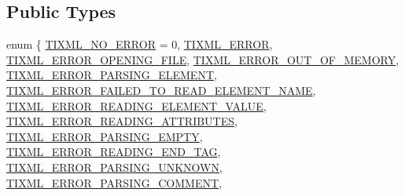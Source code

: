\subsection*{Public Types}
\begin{DoxyCompactItemize}
\item 
enum \{ \newline
\hyperlink{class_ti_xml_base_a4b788e6990f18d930cc68e38587f05cda750a76ca602241c416d5ec357d55fba1}{T\+I\+X\+M\+L\+\_\+\+N\+O\+\_\+\+E\+R\+R\+OR} = 0, 
\hyperlink{class_ti_xml_base_a4b788e6990f18d930cc68e38587f05cdabcabc1b8efabeda1cc4352aa73d64390}{T\+I\+X\+M\+L\+\_\+\+E\+R\+R\+OR}, 
\hyperlink{class_ti_xml_base_a4b788e6990f18d930cc68e38587f05cdab803949b8f12e03b5b57f86d9c52b614}{T\+I\+X\+M\+L\+\_\+\+E\+R\+R\+O\+R\+\_\+\+O\+P\+E\+N\+I\+N\+G\+\_\+\+F\+I\+LE}, 
\hyperlink{class_ti_xml_base_a4b788e6990f18d930cc68e38587f05cda92e3bfc96126d3544f47e8b3f031e7bb}{T\+I\+X\+M\+L\+\_\+\+E\+R\+R\+O\+R\+\_\+\+O\+U\+T\+\_\+\+O\+F\+\_\+\+M\+E\+M\+O\+RY}, 
\newline
\hyperlink{class_ti_xml_base_a4b788e6990f18d930cc68e38587f05cda5cbfcf7fe5e67f0cd1aef98deac55dd2}{T\+I\+X\+M\+L\+\_\+\+E\+R\+R\+O\+R\+\_\+\+P\+A\+R\+S\+I\+N\+G\+\_\+\+E\+L\+E\+M\+E\+NT}, 
\hyperlink{class_ti_xml_base_a4b788e6990f18d930cc68e38587f05cdadcc31ca78a9d507a88c9fafb3d18a3c4}{T\+I\+X\+M\+L\+\_\+\+E\+R\+R\+O\+R\+\_\+\+F\+A\+I\+L\+E\+D\+\_\+\+T\+O\+\_\+\+R\+E\+A\+D\+\_\+\+E\+L\+E\+M\+E\+N\+T\+\_\+\+N\+A\+ME}, 
\hyperlink{class_ti_xml_base_a4b788e6990f18d930cc68e38587f05cdafefdc75db23215e846605a2b5af0c2d3}{T\+I\+X\+M\+L\+\_\+\+E\+R\+R\+O\+R\+\_\+\+R\+E\+A\+D\+I\+N\+G\+\_\+\+E\+L\+E\+M\+E\+N\+T\+\_\+\+V\+A\+L\+UE}, 
\hyperlink{class_ti_xml_base_a4b788e6990f18d930cc68e38587f05cda670fac23171b64829f90639cc3696d6e}{T\+I\+X\+M\+L\+\_\+\+E\+R\+R\+O\+R\+\_\+\+R\+E\+A\+D\+I\+N\+G\+\_\+\+A\+T\+T\+R\+I\+B\+U\+T\+ES}, 
\newline
\hyperlink{class_ti_xml_base_a4b788e6990f18d930cc68e38587f05cda5f2aee664733a20f13f6f77556b9fa85}{T\+I\+X\+M\+L\+\_\+\+E\+R\+R\+O\+R\+\_\+\+P\+A\+R\+S\+I\+N\+G\+\_\+\+E\+M\+P\+TY}, 
\hyperlink{class_ti_xml_base_a4b788e6990f18d930cc68e38587f05cda175f7c72e2f9630bb96ef5137b325502}{T\+I\+X\+M\+L\+\_\+\+E\+R\+R\+O\+R\+\_\+\+R\+E\+A\+D\+I\+N\+G\+\_\+\+E\+N\+D\+\_\+\+T\+AG}, 
\hyperlink{class_ti_xml_base_a4b788e6990f18d930cc68e38587f05cda24c814fdcf1d84704869e6f76b19cb6e}{T\+I\+X\+M\+L\+\_\+\+E\+R\+R\+O\+R\+\_\+\+P\+A\+R\+S\+I\+N\+G\+\_\+\+U\+N\+K\+N\+O\+WN}, 
\hyperlink{class_ti_xml_base_a4b788e6990f18d930cc68e38587f05cda72e3072a44be499edb89593f6ce10f6c}{T\+I\+X\+M\+L\+\_\+\+E\+R\+R\+O\+R\+\_\+\+P\+A\+R\+S\+I\+N\+G\+\_\+\+C\+O\+M\+M\+E\+NT}, 

\end{DoxyCompactItemize}
